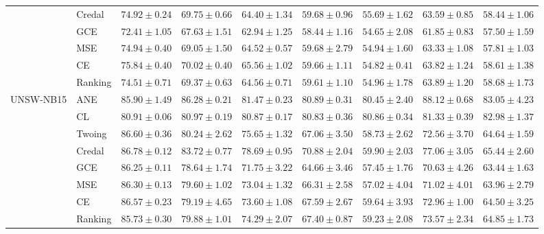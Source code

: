 \documentclass[letterpaper]{article} %
\begin{document}
\begin{table}[t]
\begin{tabular}{clccccccc}
 & Credal & $74.92 \pm 0.24$ & $69.75 \pm 0.66$ & $64.40 \pm 1.34$ & $59.68 \pm 0.96$ & $55.69 \pm 1.62$ & $63.59 \pm 0.85$ & $58.44 \pm 1.06$ \\ 
 & GCE    & $72.41 \pm 1.05$ & $67.63 \pm 1.51$ & $62.94 \pm 1.25$ & $58.44 \pm 1.16$ & $54.65 \pm 2.08$ & $61.85 \pm 0.83$ & $57.50 \pm 1.59$ \\ 
 & MSE    & $74.94 \pm 0.40$ & $69.05 \pm 1.50$ & $64.52 \pm 0.57$ & $59.68 \pm 2.79$ & $54.94 \pm 1.60$ & $63.33 \pm 1.08$ & $57.81 \pm 1.03$ \\ 
 & CE     & $\mathbf{75.84 \pm 0.40}$ & $70.02 \pm 0.40$ & $65.56 \pm 1.02$ & $59.66 \pm 1.11$ & $54.82 \pm 0.41$ & $63.82 \pm 1.24$ & $58.61 \pm 1.38$ \\ 
 & Ranking & $74.51 \pm 0.71$ & $69.37 \pm 0.63$ & $64.56 \pm 0.71$ & $59.61 \pm 1.10$ & $54.96 \pm 1.78$ & $63.89 \pm 1.20$ & $58.68 \pm 1.73$ \\ 
\hline
\multirow{8}{*}{UNSW-NB15}
 & ANE    & $\mathbf{85.90 \pm 1.49}$ & $\mathbf{86.28 \pm 0.21}$ & $\mathbf{81.47 \pm 0.23}$ & $\mathbf{80.89 \pm 0.31}$ & $\mathbf{80.45 \pm 2.40}$ & $\mathbf{88.12 \pm 0.68}$ & $\mathbf{83.05 \pm 4.23}$ \\ 
 & CL     & $80.91 \pm 0.06$ & $80.97 \pm 0.19$ & $80.87 \pm 0.17$ & $\mathbf{80.83 \pm 0.36}$ & $\mathbf{80.86 \pm 0.34}$ & $81.33 \pm 0.39$ & $\mathbf{82.98 \pm 1.37}$ \\ 
 & Twoing & $\mathbf{86.60 \pm 0.36}$ & $80.24 \pm 2.62$ & $75.65 \pm 1.32$ & $67.06 \pm 3.50$ & $58.73 \pm 2.62$ & $72.56 \pm 3.70$ & $64.64 \pm 1.59$ \\ 
 & Credal & $\mathbf{86.78 \pm 0.12}$ & $83.72 \pm 0.77$ & $78.69 \pm 0.95$ & $70.88 \pm 2.04$ & $59.90 \pm 2.03$ & $77.06 \pm 3.05$ & $65.44 \pm 2.60$ \\ 
 & GCE    & $86.25 \pm 0.11$ & $78.64 \pm 1.74$ & $71.75 \pm 3.22$ & $64.66 \pm 3.46$ & $57.45 \pm 1.76$ & $70.63 \pm 4.26$ & $63.44 \pm 1.63$ \\ 
 & MSE    & $86.30 \pm 0.13$ & $79.60 \pm 1.02$ & $73.04 \pm 1.32$ & $66.31 \pm 2.58$ & $57.02 \pm 4.04$ & $71.02 \pm 4.01$ & $63.96 \pm 2.79$ \\ 
 & CE     & $\mathbf{86.57 \pm 0.23}$ & $79.19 \pm 4.65$ & $73.60 \pm 1.08$ & $67.59 \pm 2.67$ & $59.64 \pm 3.93$ & $72.96 \pm 1.00$ & $64.50 \pm 3.25$ \\ 
 & Ranking & $85.73 \pm 0.30$ & $79.88 \pm 1.01$ & $74.29 \pm 2.07$ & $67.40 \pm 0.87$ & $59.23 \pm 2.08$ & $73.57 \pm 2.34$ & $64.85 \pm 1.73$ \\ 
\hline

\end{tabular}
\end{table}
\end{document}
